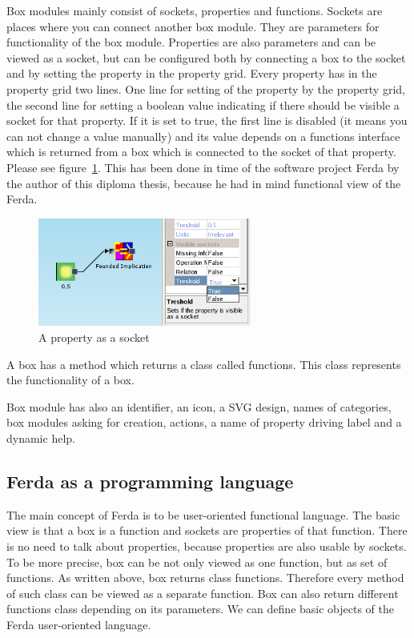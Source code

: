 \documentclass[a4paper,12pt]{book}
\begin{document}
Box modules mainly consist of sockets, properties and functions. Sockets are places where you can connect another box module. They are parameters for functionality of the box module. Properties are also parameters and can be viewed as a socket, but can be configured both by connecting a box to the socket and by setting the property in the property grid. Every property has in the property grid two lines. One line for setting of the property by the property grid, the second line for setting a boolean value indicating if there should be visible a socket for that property. If it is set to true, the first line is disabled (it means you can not change a value manually) and its value depends on a functions interface which is returned from a box which is connected to the socket of that property. Please see figure~\ref{fig:propertyAsASocket}. This has been done in time of the software project Ferda by the author of this diploma thesis, because he had in mind functional view of the Ferda. 
\begin{figure}
	\includegraphics[width=7cm]{property_as_socket}
	\caption{A property as a socket}
	\label{fig:propertyAsASocket}
\end{figure}

A box has a method which returns a class called functions. This class represents the functionality of a box.

Box module has also an identifier, an icon, a SVG design, names of categories, box modules asking for creation, actions, a name of property driving label and a dynamic help.

\subsection{Ferda as a programming language}
The main concept of Ferda is to be user-oriented functional language. The basic view is that a box is a function and sockets are properties of that function. There is no need to talk about properties, because properties are also usable by sockets. To be more precise, box can be not only viewed as one function, but as set of functions. As written above, box returns class functions. Therefore every method of such class can be viewed as a separate function. Box can also return different functions class depending on its parameters. We can define basic objects of the Ferda user-oriented language.
\end{document}
